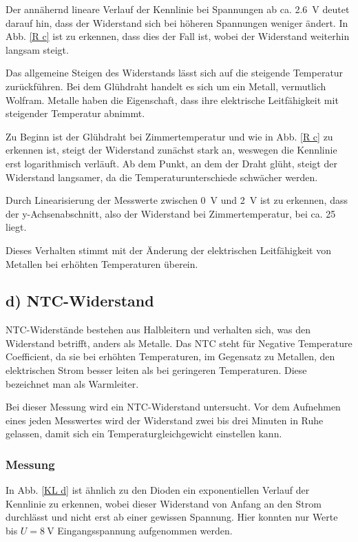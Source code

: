 \documentclass[11pt,a4paper,titlepage, ngerman]{article}
\begin{document}
				Der annähernd lineare Verlauf der Kennlinie bei Spannungen ab ca. \SI{2.6}{\V} deutet darauf hin, dass der Widerstand sich bei höheren Spannungen weniger ändert.
				In Abb. \ref{R c} ist zu erkennen, dass dies der Fall ist, wobei der Widerstand weiterhin langsam steigt.
				
				Das allgemeine Steigen des Widerstands lässt sich auf die steigende Temperatur zurückführen.
				Bei dem Glühdraht handelt es sich um ein Metall, vermutlich Wolfram.
				Metalle haben die Eigenschaft, dass ihre elektrische Leitfähigkeit mit steigender Temperatur abnimmt.
				
				Zu Beginn ist der Glühdraht bei Zimmertemperatur und wie in Abb. \ref{R c} zu erkennen ist, steigt der Widerstand zunächst stark an, weswegen die Kennlinie erst logarithmisch verläuft.
				Ab dem Punkt, an dem der Draht glüht, steigt der Widerstand langsamer, da die Temperaturunterschiede schwächer werden.
				
				Durch Linearisierung der Messwerte zwischen \SI{0}{\V} und \SI{2}{\V} ist zu erkennen, dass der y-Achsenabschnitt, also der Widerstand bei Zimmertemperatur, bei ca. \SI{25}{\Omega} liegt.
				
				Dieses Verhalten stimmt mit der Änderung der elektrischen Leitfähigkeit von Metallen bei erhöhten Temperaturen überein.
				
		\subsection{d) NTC-Widerstand} 
			
			NTC-Widerstände bestehen aus Halbleitern und verhalten sich, was den Widerstand betrifft, anders als Metalle.
			Das \glqq NTC\grqq{} steht für \glqq Negative Temperature Coefficient\grqq{}, da sie bei erhöhten Temperaturen, im Gegensatz zu Metallen, den elektrischen Strom besser leiten als bei geringeren Temperaturen. Diese bezeichnet man als Warmleiter.
			
			Bei dieser Messung wird ein NTC-Widerstand untersucht.
			Vor dem Aufnehmen eines jeden Messwertes wird der Widerstand zwei bis drei Minuten in Ruhe gelassen, damit sich ein Temperaturgleichgewicht einstellen kann.
			
			\subsubsection*{Messung}
			
				In Abb. \ref{KL d} ist ähnlich zu den Dioden ein exponentiellen Verlauf der Kennlinie zu erkennen, wobei dieser Widerstand von Anfang an den Strom durchlässt und nicht erst ab einer gewissen Spannung.
				Hier konnten nur Werte bis $U = \SI{8}{\V}$ Eingangsspannung aufgenommen werden.
				
\end{document}

